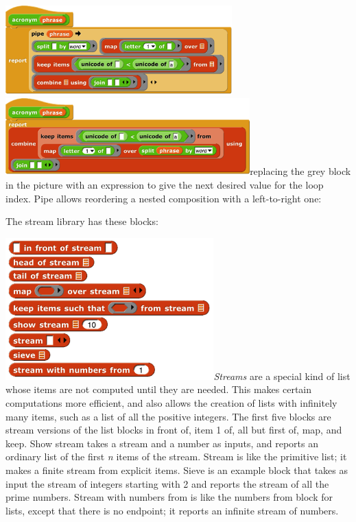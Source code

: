 \includegraphics[width=3.44097in,height=1.36111in]{media/image391.png}\includegraphics[width=3.70972in,height=1.17153in]{media/image392.png}replacing
the grey block in the picture with an expression to give the next
desired value for the loop index. Pipe allows reordering a nested
composition with a left-to-right one:

The stream library has these blocks:

\includegraphics[width=3.16111in,height=2.15347in]{media/image393.png}\emph{Streams}
are a special kind of list whose items are not computed until they are
needed. This makes certain computations more efficient, and also allows
the creation of lists with infinitely many items, such as a list of all
the positive integers. The first five blocks are stream versions of the
list blocks in front of, item 1 of, all but first of, map, and keep.
Show stream takes a stream and a number as inputs, and reports an
ordinary list of the first \emph{n} items of the stream. Stream is like
the primitive list; it makes a finite stream from explicit items. Sieve
is an example block that takes as input the stream of integers starting
with 2 and reports the stream of all the prime numbers. Stream with
numbers from is like the numbers from block for lists, except that there
is no endpoint; it reports an infinite stream of numbers.

